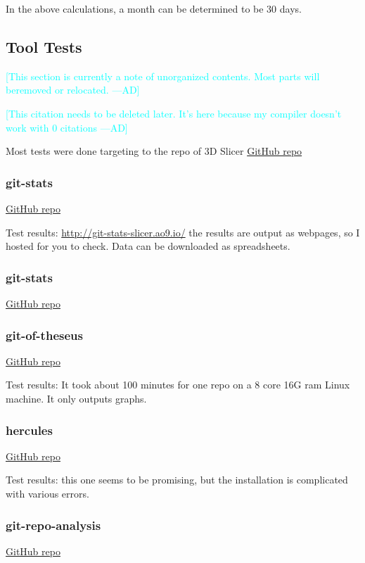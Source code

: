 \documentclass[letterpaper,cleveref]{lipics-v2019}
\newcommand{\authornote}[3]{\textcolor{#1}{[#3 ---#2]}}
\newcommand{\authornote}[3]{}
\newcommand{\ad}[1]{\authornote{cyan}{AD}{#1}} %
\theoremstyle{definition}
\begin{document}
In the above calculations, a month can be determined to be 30 days.

\subsection{Tool Tests}
\ad{This section is currently a note of unorganized contents. Most parts will beremoved or relocated.}

\ad{This citation needs to be deleted later. It's here because my compiler
doesn't work with 0 citations}
\cite{Emms2019}

Most tests were done targeting to the repo of 3D Slicer
\href{https://github.com/tomgi/git_stats}{GitHub repo}

\subsubsection{git-stats}\label{gitstats}
\href{https://github.com/tomgi/git_stats}{GitHub repo}

Test results:
\href{http://git-stats-slicer.ao9.io/}{http://git-stats-slicer.ao9.io/} the
results are output as webpages, so I hosted for you to check. Data can be
downloaded as spreadsheets.


\subsubsection{git-stats}\label{scc}
\href{https://github.com/boyter/scc}{GitHub repo}


\subsubsection{git-of-theseus}
\href{https://github.com/erikbern/git-of-theseus}{GitHub repo}

Test results: It took about 100 minutes for one repo on a 8 core 16G ram Linux
machine. It only outputs graphs.

\subsubsection{hercules}
\href{https://github.com/src-d/hercules}{GitHub repo}

Test results: this one seems to be promising, but the installation is
complicated with various errors.

\subsubsection{git-repo-analysis}
\href{https://github.com/larsxschneider/git-repo-analysis}{GitHub repo}
\end{document}
